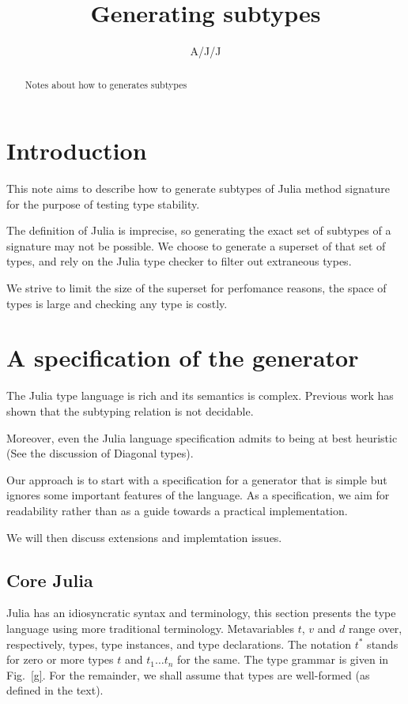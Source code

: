 \documentclass{paper}
\newcommand{\EM}[1]{\ensuremath{#1}\xspace}    %
\newcommand{\m}[1]{\EM{{#1^{*}}}}                     %
\renewcommand{\t}{\EM{t}}                            %
\renewcommand{\v}{\EM{v}}                            %
\renewcommand{\d}{\EM{d}}                            %
\begin{document}
\title{Generating subtypes}
\author{A/J/J}
\maketitle
\begin{abstract}
Notes about how to generates subtypes
\end{abstract}

\section{Introduction}

This note aims to describe how to generate subtypes of Julia method signature
for the purpose of testing type stability.

The definition of Julia is imprecise, so generating the exact set of
subtypes of a signature may not be possible. We choose to generate a
superset of that set of types, and rely on the Julia type checker to
filter out extraneous types.

We strive to limit the size of the superset for perfomance reasons, the space
of types is large and checking any type is costly.

\section{A specification of the generator}

The Julia type language is rich and its semantics is complex. Previous
work has shown that the subtyping relation is not decidable.

Moreover, even the Julia language specification admits to being at best
heuristic (See the discussion of Diagonal types).

Our approach is to start with a specification for a generator that is
simple but ignores some important features of the language. As a
specification, we aim for readability rather than as a guide towards a
practical implementation.

We will then discuss extensions and implemtation issues.

\subsection{Core Julia}

\newcommand{\Any}{\EM{\mathit{Any}}}

Julia has an idiosyncratic syntax and terminology, this section
presents the type language using more traditional
terminology. Metavariables \t, \v and \d range over, respectively,
types, type instances, and type declarations.  The notation \m\t
stands for zero or more types \t and $\t_1\dots\t_n$ for the same.
The type grammar is given in Fig.~\ref{g}.  For the remainder, we
shall assume that types are well-formed (as defined in the text).
\end{document}

